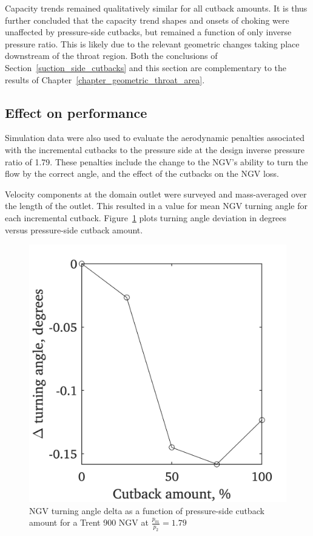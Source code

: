 \documentclass[a4paper, 11pt, oneside]{report}
\begin{document}
Capacity trends remained qualitatively similar for all cutback amounts. It is thus further concluded that the capacity trend shapes and onsets of choking were unaffected by pressure-side cutbacks, but remained a function of only inverse pressure ratio. This is likely due to the relevant geometric changes taking place downstream of the throat region. Both the conclusions of Section~\ref{suction_side_cutbacks} and this section are complementary to the results of Chapter~\ref{chapter_geometric_throat_area}.

\subsection{Effect on performance}

Simulation data were also used to evaluate the aerodynamic penalties associated with the incremental cutbacks to the pressure side at the design inverse pressure ratio of 1.79. These penalties include the change to the NGV's ability to turn the flow by the correct angle, and the effect of the cutbacks on the NGV loss.

Velocity components at the domain outlet were surveyed and mass-averaged over the length of the outlet. This resulted in a value for mean NGV turning angle for each incremental cutback. Figure~\ref{fig:ps_cutbacks_vs_turning_angles} plots turning angle deviation in degrees versus pressure-side cutback amount.

\begin{figure}[H]
	\centering
	\includegraphics[width=.45\textwidth]{figs/ps_cutbacks_vs_turning_angles.png}
	\caption{NGV turning angle delta as a function of pressure-side cutback amount for a Trent 900 NGV at $\frac{p_{01}}{p_2}=1.79$}
    \label{fig:ps_cutbacks_vs_turning_angles}
\end{figure}
\end{document}
